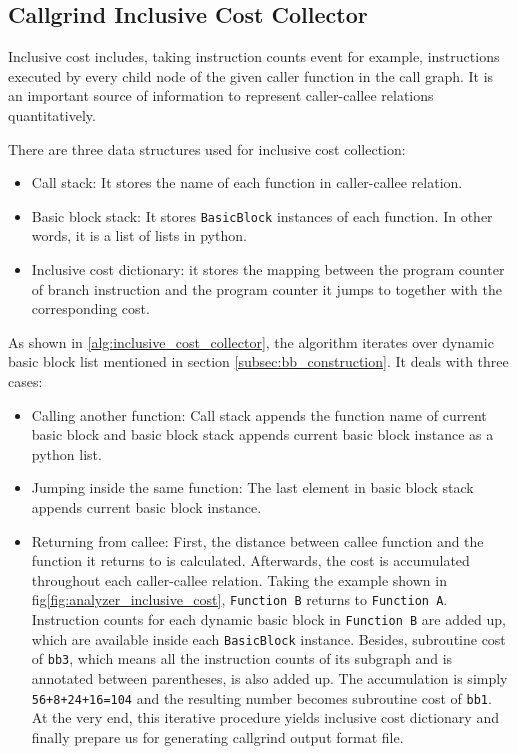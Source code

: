 \subsection{Callgrind Inclusive Cost Collector}
\label{subsec:inclusive_cost}

Inclusive cost includes, taking instruction counts event for example, instructions executed by every child node of the given caller function in the call graph. It is an important source of information to represent caller-callee relations quantitatively.

\medskip

There are three data structures used for inclusive cost collection:

\begin{itemize}
    \item Call stack: It stores the name of each function in caller-callee relation.
    \item Basic block stack: It stores \texttt{BasicBlock} instances of each function. In other words, it is a list of lists in python. 
    \item Inclusive cost dictionary: it stores the mapping between the program counter of branch instruction and the program counter it jumps to together with the corresponding cost. 
\end{itemize}

As shown in \ref{alg:inclusive_cost_collector}, the algorithm iterates over dynamic basic block list mentioned in section \ref{subsec:bb_construction}. It deals with three cases:

\begin{itemize}
    \item Calling another function: Call stack appends the function name of current basic block and basic block stack appends current basic block instance as a python list.
    \item Jumping inside the same function: The last element in basic block stack appends current basic block instance.
    \item Returning from callee: First, the distance between callee function and the function it returns to is calculated. Afterwards, the cost is accumulated throughout each caller-callee relation. Taking the example shown in fig\ref{fig:analyzer_inclusive_cost}, \texttt{Function B} returns to \texttt{Function A}. Instruction counts for each dynamic basic block in \texttt{Function B} are added up, which are available inside each \texttt{BasicBlock} instance. Besides, subroutine cost of \texttt{bb3}, which means all the instruction counts of its subgraph and is annotated between parentheses, is also added up. The accumulation is simply \texttt{56+8+24+16=104} and the resulting number becomes subroutine cost of \texttt{bb1}. At the very end, this iterative procedure yields inclusive cost dictionary and finally prepare us for generating callgrind output format file. 
\end{itemize}

